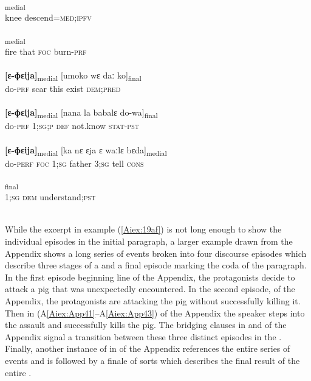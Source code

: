 \documentclass[output=paper]{LSP/langsci}
\begin{document}
	\begin{exe}
\ex \label{Aiex:19af}
\begin{xlist}
\ex \label{Aiex:19a}
\gll [gulu	tila=nɛgɛː]\textsubscript{medial}\\
knee	descend\textsc{=med;ipfv}\\
\glt {}\\
\ex \label{Aiex:19b}
\textsubscript{medial}\\
fire	that	\textsc{foc}	burn\textsc{-prf}\\
\glt {}\\
\ex \label{Aiex:19c}
\gll \textbf{[ɛ-ɸɛija]}\textsubscript{medial}	[umoko	wɛ	daː	ko]\textsubscript{final}\\
do\textsc{-prf}	scar	this	exist	\textsc{dem;pred}\\
\glt {}\\
\ex \label{Aiex:19d}
\gll \textbf{[ɛ-ɸɛija]}\textsubscript{medial}	[nana	la	babalɛ	do-wa]\textsubscript{final}\\
do\textsc{-prf}	\textsc{1;sg;p}	\textsc{def}	not.know	\textsc{stat-pst}\\
\glt {}\\
\ex \label{Aiex:19e}
\gll \textbf{[ɛ-ɸɛija]}\textsubscript{medial}	[ka	nɛ	ɛja	ɛ	waːlɛ	bɛda]\textsubscript{medial}\\
do-\textsc{perf}	\textsc{foc}	\textsc{1;sg}	father	\textsc{3;sg}	tell	\textsc{cons}\\
\glt {}\\
\ex \label{Aiex:19f}
\textsubscript{final}\\
\textsc{1;sg}	\textsc{dem}	understand\textsc{;pst}\\
\glt {}\\
\end{xlist}
\end{exe}

	While the excerpt in example (\ref{Aiex:19af}) is not long enough to show the individual episodes in the initial paragraph, a larger example drawn from the Appendix shows a long series of events broken into four discourse episodes which describe three stages of a  and a final episode marking the coda of the paragraph. In the first episode beginning line  of the Appendix, the protagonists decide to attack a pig that was unexpectedly encountered. In the second episode,  of the Appendix, the protagonists are attacking the pig without successfully killing it. Then in (A\ref{Aiex:App41}--A\ref{Aiex:App43}) of the Appendix the speaker steps into the assault and successfully kills the pig. The bridging clauses in  and  of the Appendix signal a transition between these three distinct episodes in the . Finally, another instance of  in  of the Appendix references the entire series of events and is followed by a finale of sorts which describes the final result of the entire .
	
\end{document}
